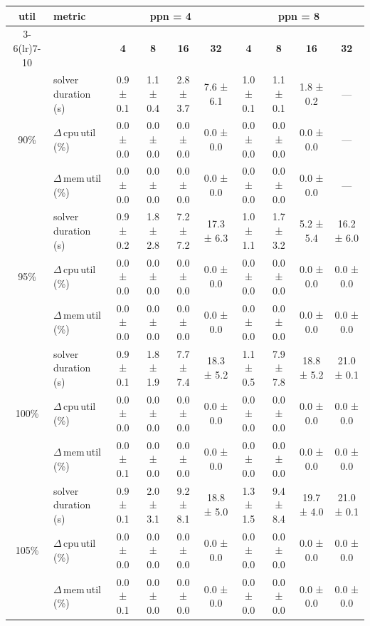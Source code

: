 \begin{tabular}{@{}c l *{8}{c}@{}}
\toprule
\multirow{2}{*}{\textbf{util}} & \multirow{2}{*}{\textbf{metric}} &\multicolumn{4}{c}{\textbf{ppn = 4}} & \multicolumn{4}{c}{\textbf{ppn = 8}}\\
\cmidrule(lr){3-6}\cmidrule(lr){7-10}
 &  & \textbf{4} & \textbf{8} & \textbf{16} & \textbf{32} & \textbf{4} & \textbf{8} & \textbf{16} & \textbf{32}\\
\midrule
\multirow{3}{*}{90\%}
& solver\,duration\,(s) & 0.9 ± 0.1 & 1.1 ± 0.4 & 2.8 ± 3.7 & 7.6 ± 6.1 & 1.0 ± 0.1 & 1.1 ± 0.1 & 1.8 ± 0.2 & \multicolumn{1}{c}{—} \\
& $\Delta$\,cpu\,util\,(\%) & 0.0 ± 0.0 & 0.0 ± 0.0 & 0.0 ± 0.0 & 0.0 ± 0.0 & 0.0 ± 0.0 & 0.0 ± 0.0 & 0.0 ± 0.0 & \multicolumn{1}{c}{—} \\
& $\Delta$\,mem\,util\,(\%) & 0.0 ± 0.0 & 0.0 ± 0.0 & 0.0 ± 0.0 & 0.0 ± 0.0 & 0.0 ± 0.0 & 0.0 ± 0.0 & 0.0 ± 0.0 & \multicolumn{1}{c}{—} \\
\midrule
\multirow{3}{*}{95\%}
& solver\,duration\,(s) & 0.9 ± 0.2 & 1.8 ± 2.8 & 7.2 ± 7.2 & 17.3 ± 6.3 & 1.0 ± 1.1 & 1.7 ± 3.2 & 5.2 ± 5.4 & 16.2 ± 6.0 \\
& $\Delta$\,cpu\,util\,(\%) & 0.0 ± 0.0 & 0.0 ± 0.0 & 0.0 ± 0.0 & 0.0 ± 0.0 & 0.0 ± 0.0 & 0.0 ± 0.0 & 0.0 ± 0.0 & 0.0 ± 0.0 \\
& $\Delta$\,mem\,util\,(\%) & 0.0 ± 0.0 & 0.0 ± 0.0 & 0.0 ± 0.0 & 0.0 ± 0.0 & 0.0 ± 0.0 & 0.0 ± 0.0 & 0.0 ± 0.0 & 0.0 ± 0.0 \\
\midrule
\multirow{3}{*}{100\%}
& solver\,duration\,(s) & 0.9 ± 0.1 & 1.8 ± 1.9 & 7.7 ± 7.4 & 18.3 ± 5.2 & 1.1 ± 0.5 & 7.9 ± 7.8 & 18.8 ± 5.2 & 21.0 ± 0.1 \\
& $\Delta$\,cpu\,util\,(\%) & 0.0 ± 0.0 & 0.0 ± 0.0 & 0.0 ± 0.0 & 0.0 ± 0.0 & 0.0 ± 0.0 & 0.0 ± 0.0 & 0.0 ± 0.0 & 0.0 ± 0.0 \\
& $\Delta$\,mem\,util\,(\%) & 0.0 ± 0.1 & 0.0 ± 0.0 & 0.0 ± 0.0 & 0.0 ± 0.0 & 0.0 ± 0.0 & 0.0 ± 0.0 & 0.0 ± 0.0 & 0.0 ± 0.0 \\
\midrule
\multirow{3}{*}{105\%}
& solver\,duration\,(s) & 0.9 ± 0.1 & 2.0 ± 3.1 & 9.2 ± 8.1 & 18.8 ± 5.0 & 1.3 ± 1.5 & 9.4 ± 8.4 & 19.7 ± 4.0 & 21.0 ± 0.1 \\
& $\Delta$\,cpu\,util\,(\%) & 0.0 ± 0.0 & 0.0 ± 0.0 & 0.0 ± 0.0 & 0.0 ± 0.0 & 0.0 ± 0.0 & 0.0 ± 0.0 & 0.0 ± 0.0 & 0.0 ± 0.0 \\
& $\Delta$\,mem\,util\,(\%) & 0.0 ± 0.1 & 0.0 ± 0.0 & 0.0 ± 0.0 & 0.0 ± 0.0 & 0.0 ± 0.0 & 0.0 ± 0.0 & 0.0 ± 0.0 & 0.0 ± 0.0 \\
\bottomrule
\end{tabular}
